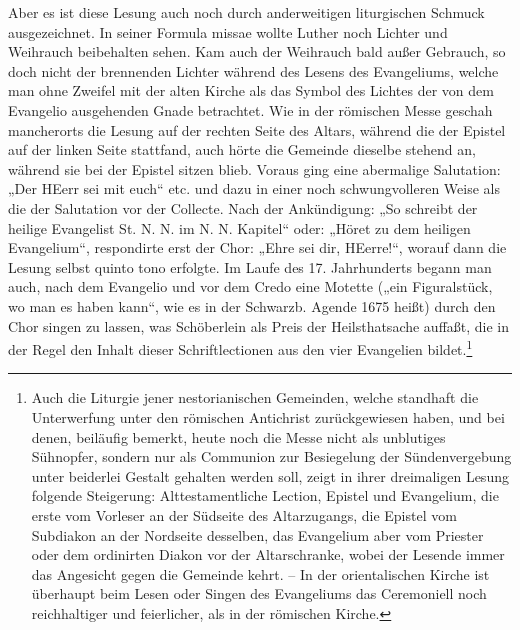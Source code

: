 Aber es ist diese Lesung auch noch durch anderweitigen liturgischen Schmuck ausgezeichnet. In seiner Formula missae wollte Luther noch Lichter und Weihrauch beibehalten sehen. Kam auch der Weihrauch bald außer Gebrauch, so doch nicht der brennenden Lichter während des Lesens des Evangeliums, welche man ohne Zweifel mit der alten Kirche als das Symbol des Lichtes der von dem Evangelio ausgehenden Gnade betrachtet. Wie in der römischen Messe geschah mancherorts die Lesung auf der rechten Seite des Altars, während die der Epistel auf der linken Seite stattfand, auch hörte die Gemeinde dieselbe stehend an, während sie bei der Epistel sitzen blieb. Voraus ging eine abermalige Salutation: „Der HEerr sei mit euch“ etc. und dazu in einer noch schwungvolleren Weise als die der Salutation vor der Collecte. Nach der Ankündigung: „So schreibt der heilige Evangelist St. N. N. im N. N. Kapitel“ oder: „Höret zu dem heiligen Evangelium“, respondirte erst der Chor: „Ehre sei dir, HEerre!“, worauf dann die Lesung selbst quinto tono erfolgte. Im Laufe des 17. Jahrhunderts begann man auch, nach dem Evangelio und vor dem Credo eine Motette („ein Figuralstück, wo man es haben kann“, wie es in der Schwarzb. Agende 1675 heißt) durch den Chor singen zu lassen, was Schöberlein als Preis der Heilsthatsache auffaßt, die in der Regel den Inhalt dieser Schriftlectionen aus den vier Evangelien bildet.\footnote{Auch die Liturgie jener nestorianischen Gemeinden, welche standhaft die Unterwerfung unter den römischen Antichrist zurückgewiesen haben, und bei denen, beiläufig bemerkt, heute noch die Messe nicht als unblutiges Sühnopfer, sondern nur als Communion zur Besiegelung der Sündenvergebung unter beiderlei Gestalt gehalten werden soll, zeigt in ihrer dreimaligen Lesung folgende Steigerung: Alttestamentliche Lection, Epistel und Evangelium, die erste vom Vorleser an der Südseite des Altarzugangs, die Epistel vom Subdiakon an der Nordseite desselben, das Evangelium aber vom Priester oder dem ordinirten Diakon vor der Altarschranke, wobei der Lesende immer das Angesicht gegen die Gemeinde kehrt. -- In der orientalischen Kirche ist überhaupt beim Lesen oder Singen des Evangeliums das Ceremoniell noch reichhaltiger und feierlicher, als in der römischen Kirche.}


